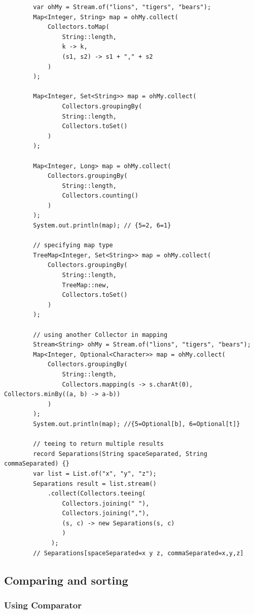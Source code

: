 \documentclass{scrartcl}
\begin{document}
    \begin{lstlisting}
        var ohMy = Stream.of("lions", "tigers", "bears");
        Map<Integer, String> map = ohMy.collect(
            Collectors.toMap(
                String::length,
                k -> k,
                (s1, s2) -> s1 + "," + s2
            )
        );

        Map<Integer, Set<String>> map = ohMy.collect(
                Collectors.groupingBy(
                String::length,
                Collectors.toSet()
            )
        );

        Map<Integer, Long> map = ohMy.collect(
            Collectors.groupingBy(
                String::length,
                Collectors.counting()
            )
        );
        System.out.println(map); // {5=2, 6=1}

        // specifying map type
        TreeMap<Integer, Set<String>> map = ohMy.collect(
            Collectors.groupingBy(
                String::length,
                TreeMap::new,
                Collectors.toSet()
            )
        );

        // using another Collector in mapping
        Stream<String> ohMy = Stream.of("lions", "tigers", "bears");
        Map<Integer, Optional<Character>> map = ohMy.collect(
            Collectors.groupingBy(
                String::length,
                Collectors.mapping(s -> s.charAt(0), Collectors.minBy((a, b) -> a-b))
            )
        );
        System.out.println(map); //{5=Optional[b], 6=Optional[t]}

        // teeing to return multiple results
        record Separations(String spaceSeparated, String commaSeparated) {}
        var list = List.of("x", "y", "z");
        Separations result = list.stream()
            .collect(Collectors.teeing(
                Collectors.joining(" "),
                Collectors.joining(","),
                (s, c) -> new Separations(s, c)
                )
             );
        // Separations[spaceSeparated=x y z, commaSeparated=x,y,z]

    \end{lstlisting}

\subsection{Comparing and sorting}

\subsubsection{Using Comparator}
\end{document}
